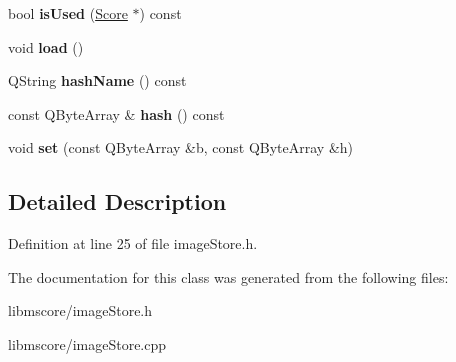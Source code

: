 \begin{DoxyCompactItemize}
bool {\bfseries is\+Used} (\hyperlink{class_ms_1_1_score}{Score} $\ast$) const
\item 
\mbox{\label{class_ms_1_1_image_store_item_a74f61083eb2cd8b45ea8532ae41a3015}} 
void {\bfseries load} ()
\item 
\mbox{\label{class_ms_1_1_image_store_item_a94590a2238ceeae16a3111be876ecdab}} 
Q\+String {\bfseries hash\+Name} () const
\item 
\mbox{\label{class_ms_1_1_image_store_item_a3be0da9a905eb8012f23fab3e4601f2a}} 
const Q\+Byte\+Array \& {\bfseries hash} () const
\item 
\mbox{\label{class_ms_1_1_image_store_item_adc19d2712478bae04a551b07c9a1b2e0}} 
void {\bfseries set} (const Q\+Byte\+Array \&b, const Q\+Byte\+Array \&h)
\end{DoxyCompactItemize}


\subsection{Detailed Description}


Definition at line 25 of file image\+Store.\+h.



The documentation for this class was generated from the following files\+:\begin{DoxyCompactItemize}
\item 
libmscore/image\+Store.\+h\item 
libmscore/image\+Store.\+cpp\end{DoxyCompactItemize}
